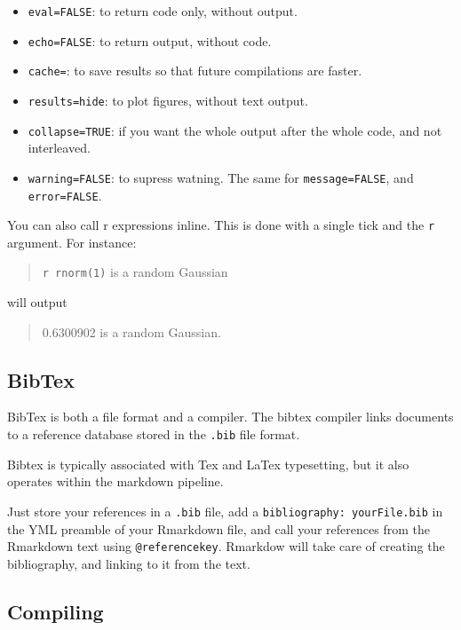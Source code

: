 \documentclass[]{book}
\providecommand{\tightlist}{%
  \setlength{\itemsep}{0pt}\setlength{\parskip}{0pt}}
\theoremstyle{definition}
\theoremstyle{definition}
\theoremstyle{definition}
\theoremstyle{remark}
\begin{document}
\begin{itemize}
\tightlist
\item
  \texttt{eval=FALSE}: to return code only, without output.
\item
  \texttt{echo=FALSE}: to return output, without code.
\item
  \texttt{cache=}: to save results so that future compilations are faster.
\item
  \texttt{results=\textquotesingle{}hide\textquotesingle{}}: to plot figures, without text output.
\item
  \texttt{collapse=TRUE}: if you want the whole output after the whole code, and not interleaved.
\item
  \texttt{warning=FALSE}: to supress watning. The same for \texttt{message=FALSE}, and \texttt{error=FALSE}.
\end{itemize}

You can also call r expressions inline.
This is done with a single tick and the \texttt{r} argument.
For instance:

\begin{quote}
\texttt{\textasciigrave{}r\ rnorm(1)\textasciigrave{}} is a random Gaussian
\end{quote}

will output

\begin{quote}
0.6300902 is a random Gaussian.
\end{quote}

\hypertarget{bibtex}{%
\subsection{BibTex}\label{bibtex}}

BibTex is both a file format and a compiler. The bibtex compiler links documents to a reference database stored in the \texttt{.bib} file format.

Bibtex is typically associated with Tex and LaTex typesetting, but it also operates within the markdown pipeline.

Just store your references in a \texttt{.bib} file, add a \texttt{bibliography:\ yourFile.bib} in the YML preamble of your Rmarkdown file, and call your references from the Rmarkdown text using \texttt{@referencekey}.
Rmarkdow will take care of creating the bibliography, and linking to it from the text.

\hypertarget{compiling}{%
\subsection{Compiling}\label{compiling}}
\end{document}
